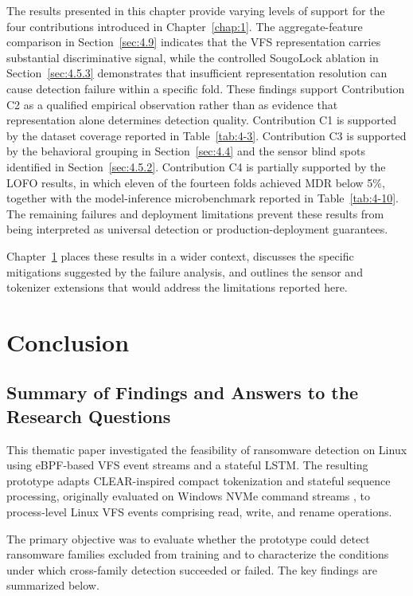 The results presented in this chapter provide varying levels of support for the four contributions introduced in Chapter~\ref{chap:1}. The aggregate-feature comparison in Section~\ref{sec:4.9} indicates that the VFS representation carries substantial discriminative signal, while the controlled SougoLock ablation in Section~\ref{sec:4.5.3} demonstrates that insufficient representation resolution can cause detection failure within a specific fold. These findings support Contribution C2 as a qualified empirical observation rather than as evidence that representation alone determines detection quality. Contribution C1 is supported by the dataset coverage reported in Table~\ref{tab:4-3}. Contribution C3 is supported by the behavioral grouping in Section~\ref{sec:4.4} and the sensor blind spots identified in Section~\ref{sec:4.5.2}. Contribution C4 is partially supported by the LOFO results, in which eleven of the fourteen folds achieved MDR below 5\%, together with the model-inference microbenchmark reported in Table~\ref{tab:4-10}. The remaining failures and deployment limitations prevent these results from being interpreted as universal detection or production-deployment guarantees.

Chapter~\ref{chap:5} places these results in a wider context, discusses the specific mitigations suggested by the failure analysis, and outlines the sensor and tokenizer extensions that would address the limitations reported here.

\chapter{Conclusion}\label{chap:5}

\section{Summary of Findings and Answers to the Research Questions}\label{sec:5.1}

This thematic paper investigated the feasibility of ransomware detection on Linux using eBPF-based VFS event streams and a stateful \textmu{}LSTM. The resulting prototype adapts CLEAR-inspired compact tokenization and stateful sequence processing, originally evaluated on Windows NVMe command streams \cite{ref9}, to process-level Linux VFS events comprising read, write, and rename operations.

The primary objective was to evaluate whether the prototype could detect ransomware families excluded from training and to characterize the conditions under which cross-family detection succeeded or failed. The key findings are summarized below.

